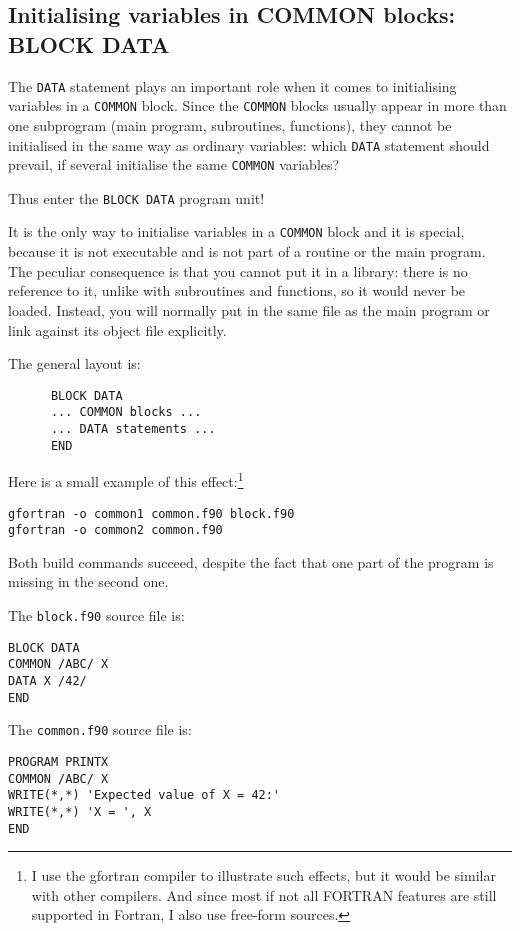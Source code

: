 \subsection{Initialising variables in COMMON blocks: BLOCK DATA}
\label{blockdata}
The \verb+DATA+ statement plays an important role when it comes to initialising
variables in a \verb+COMMON+ block. Since the \verb+COMMON+ blocks usually
appear in more than one subprogram (main program, subroutines, functions),
they cannot be initialised in the same way as ordinary variables: which
\verb+DATA+ statement should prevail, if several initialise the same
\verb+COMMON+ variables?

Thus enter the \verb+BLOCK DATA+ program unit!

It is the only way to initialise variables in a \verb+COMMON+ block and
it is special, because it is not executable and is not part of a routine
or the main program. The peculiar consequence is
that you cannot put it in a library: there is no reference to it, unlike
with subroutines and functions, so it would never be loaded. Instead, you
will normally put in the same file as the main program or link against
its object file explicitly.

The general layout is:
%
\begin{verbatim}
      BLOCK DATA
      ... COMMON blocks ...
      ... DATA statements ...
      END
\end{verbatim}

Here is a small example of this effect:\footnote{I use the gfortran compiler
to illustrate such effects, but it would be similar with other compilers.
And since most if not all FORTRAN features are still supported in Fortran,
I also use free-form sources.}
%
\begin{verbatim}
gfortran -o common1 common.f90 block.f90
gfortran -o common2 common.f90
\end{verbatim}

Both build commands succeed, despite the fact that one part of the program is missing
in the second one.

The \verb+block.f90+ source file is:
%
\begin{verbatim}
BLOCK DATA
COMMON /ABC/ X
DATA X /42/
END
\end{verbatim}

The \verb+common.f90+ source file is:
%
\begin{verbatim}
PROGRAM PRINTX
COMMON /ABC/ X
WRITE(*,*) 'Expected value of X = 42:'
WRITE(*,*) 'X = ', X
END
\end{verbatim}

